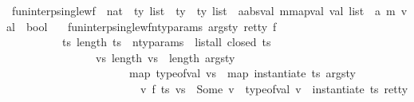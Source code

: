 \begin{isabellebody}
\ fun{\isacharunderscore}{\kern0pt}interp{\isacharunderscore}{\kern0pt}single{\isacharunderscore}{\kern0pt}wf\ {\isacharcolon}{\kern0pt}{\isacharcolon}{\kern0pt}\ {\isachardoublequoteopen}nat\ {\isasymtimes}\ ty\ list\ {\isasymtimes}\ ty\ {\isasymRightarrow}\ {\isacharparenleft}{\kern0pt}ty\ list\ {\isasymRightarrow}\ {\isacharparenleft}{\kern0pt}{\isacharprime}{\kern0pt}a{\isacharcolon}{\kern0pt}{\isacharcolon}{\kern0pt}absval{\isacharcomma}{\kern0pt}\ {\isacharprime}{\kern0pt}m{\isacharcolon}{\kern0pt}{\isacharcolon}{\kern0pt}mapval{\isacharparenright}{\kern0pt}\ val\ list\ {\isasymrightharpoonup}\ {\isacharparenleft}{\kern0pt}{\isacharprime}{\kern0pt}a{\isacharcomma}{\kern0pt}\ {\isacharprime}{\kern0pt}m{\isacharparenright}{\kern0pt}\ val{\isacharparenright}{\kern0pt}\ {\isasymRightarrow}\ bool{\isachardoublequoteclose}\isanewline
\ \ \ {\isachardoublequoteopen}fun{\isacharunderscore}{\kern0pt}interp{\isacharunderscore}{\kern0pt}single{\isacharunderscore}{\kern0pt}wf{\isacharparenleft}{\kern0pt}n{\isacharunderscore}{\kern0pt}ty{\isacharunderscore}{\kern0pt}params{\isacharcomma}{\kern0pt}\ args{\isacharunderscore}{\kern0pt}ty{\isacharcomma}{\kern0pt}\ ret{\isacharunderscore}{\kern0pt}ty{\isacharparenright}{\kern0pt}\ f\ {\isacharequal}{\kern0pt}\isanewline
\ \ \ \ \ \ \ \ \ {\isacharparenleft}{\kern0pt}{\isasymforall}\ ts{\isachardot}{\kern0pt}\ {\isacharparenleft}{\kern0pt}length\ ts\ {\isacharequal}{\kern0pt}\ n{\isacharunderscore}{\kern0pt}ty{\isacharunderscore}{\kern0pt}params\ {\isasymand}\ list{\isacharunderscore}{\kern0pt}all\ closed\ ts{\isacharparenright}{\kern0pt}\ {\isasymlongrightarrow}\ \ \isanewline
\ \ \ \ \ \ \ \ \ \ \ \ \ \ \ {\isacharparenleft}{\kern0pt}{\isasymforall}\ vs{\isachardot}{\kern0pt}\ length\ vs\ {\isacharequal}{\kern0pt}\ length\ args{\isacharunderscore}{\kern0pt}ty\ {\isasymand}\isanewline
\ \ \ \ \ \ \ \ \ \ \ \ \ \ \ \ \ \ \ \ \ \ map\ {\isacharparenleft}{\kern0pt}type{\isacharunderscore}{\kern0pt}of{\isacharunderscore}{\kern0pt}val{\isacharparenright}{\kern0pt}\ vs\ {\isacharequal}{\kern0pt}\ {\isacharparenleft}{\kern0pt}map\ {\isacharparenleft}{\kern0pt}instantiate\ ts{\isacharparenright}{\kern0pt}\ args{\isacharunderscore}{\kern0pt}ty{\isacharparenright}{\kern0pt}\ {\isasymlongrightarrow}\ \isanewline
\ \ \ \ \ \ \ \ \ \ \ \ \ \ \ \ \ \ \ \ \ \ \ \ {\isacharparenleft}{\kern0pt}{\isacharparenleft}{\kern0pt}{\isasymexists}v{\isachardot}{\kern0pt}\ f\ ts\ vs\ {\isacharequal}{\kern0pt}\ Some\ v\ {\isasymand}\ type{\isacharunderscore}{\kern0pt}of{\isacharunderscore}{\kern0pt}val\ v\ {\isacharequal}{\kern0pt}\ {\isacharparenleft}{\kern0pt}instantiate\ ts\ ret{\isacharunderscore}{\kern0pt}ty{\isacharparenright}{\kern0pt}{\isacharparenright}{\kern0pt}{\isacharparenright}{\kern0pt}{\isacharparenright}{\kern0pt}{\isacharparenright}{\kern0pt}\isanewline

\end{isabellebody}
